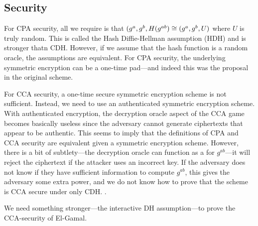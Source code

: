 \subsection{Security}
For CPA security, all we require is that $(g^a, g^b, H(g^{ab}) \cong (g^a, g^b, U)$ where $U$ is truly random. This is called the Hash Diffie-Hellman assumption (HDH) and is stronger thatn CDH. However, if we assume that the hash function is a random oracle, the assumptions are equivalent. For CPA security, the underlying symmetric encryption can be a one-time pad---and indeed this was the proposal in the original scheme.

For CCA security, a one-time secure symmetric encryption scheme is not sufficient. Instead, we need to use an authenticated symmetric encryption scheme. With authenticated encryption, the decryption oracle aspect of the CCA game becomes basically useless since the adversary cannot generate ciphertexts that appear to be authentic. This seems to imply that the definitions of CPA and CCA security are equivalent given a symmetric encryption scheme. However, there is a bit of subtlety---the decryption oracle can function as a  for $g^{ab}$---it will reject the ciphertext if the attacker uses an incorrect key. If the adversary does not know if they have sufficient information to compute $g^{ab}$, this gives the adversary some extra power, and we do not know how to prove that the scheme is CCA secure under only CDH. .

We need something stronger---the interactive DH assumption---to prove the CCA-security of El-Gamal.
